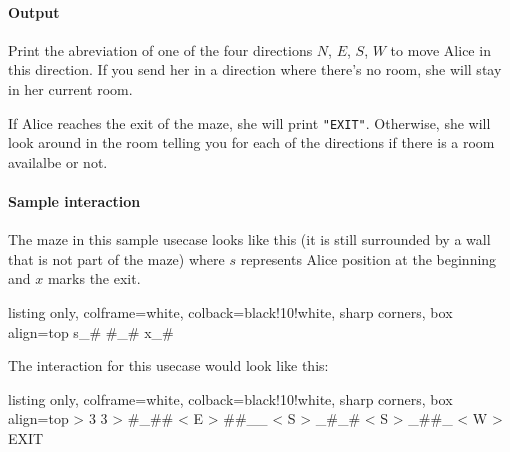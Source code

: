 \paragraph*{Output}

Print the abreviation of one of the four directions $N$, $E$, $S$, $W$ to move Alice in this direction. If you send her in a direction where there's no room, she will stay in her current room.

If Alice reaches the exit of the maze, she will print \texttt{"EXIT"}. Otherwise, she will look around in the room telling you for each of the directions if there is a room availalbe or not.

\paragraph*{Sample interaction}

The maze in this sample usecase looks like this (it is still surrounded by a wall that is not part of the maze) where $s$ represents Alice position at the beginning and $x$ marks the exit.
\noindent\begin{tcblisting}{listing only, colframe=white, colback=black!10!white, sharp corners, box align=top}
s_#
#_#
x_#
\end{tcblisting}

The interaction for this usecase would look like this:

\noindent\begin{tcblisting}{listing only, colframe=white, colback=black!10!white, sharp corners, box align=top}
> 3 3
> #_##
< E
> ##__
< S
> _#_#
< S
> _##_
< W
> EXIT
\end{tcblisting}

